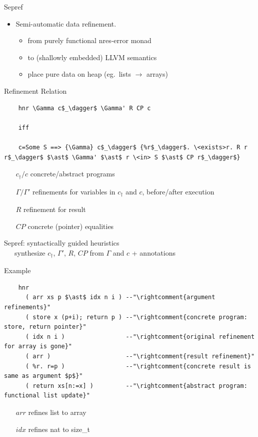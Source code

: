 \documentclass[fleqn]{beamer}
\begin{document}
\begin{frame}[fragile]{Sepref}
  \begin{itemize}
   \item Semi-automatic data refinement.
    \begin{itemize}
     \item from purely functional nres-error monad
     \item to (shallowly embedded) LLVM semantics
     \item place pure data on heap (eg.\ lists $\to$ arrays)

    \end{itemize}
  \end{itemize}
\end{frame}
\begin{frame}[fragile]{Refinement Relation}

  \begin{lstlisting}
    hnr \Gamma c$_\dagger$ \Gamma' R CP c

    iff

    c=Some S ==> {\Gamma} c$_\dagger$ {%r$_\dagger$. \<exists>r. R r r$_\dagger$ $\ast$ \Gamma' $\ast$ r \<in> S $\ast$ CP r$_\dagger$}
  \end{lstlisting}

  \begin{itemize}
   \item[{$c_\dagger / c$}] concrete/abstract programs
   \item[{$\Gamma / \Gamma'$}] refinements for variables in $c_\dagger$ and $c$, before/after execution
   \item[{$R$}] refinement for result
   \item[{$CP$}] concrete (pointer) equalities

  \end{itemize}
  \vfill

  Sepref: syntactically guided heuristics\\
    ~~~synthesize $c_\dagger$, $\Gamma'$, $R$, $CP$ from $\Gamma$ and $c$ + annotations


\end{frame}
\begin{frame}[fragile]{Example}
  \begin{lstlisting}
    hnr
      ( arr xs p $\ast$ idx n i ) --"\rightcomment{argument refinements}"
      ( store x (p+i); return p ) --"\rightcomment{concrete program: store, return pointer}"
      ( idx n i )                 --"\rightcomment{original refinement for array is gone}"
      ( arr )                     --"\rightcomment{result refinement}"
      ( %r. r=p )                 --"\rightcomment{concrete result is same as argument $p$}"
      ( return xs[n:=x] )         --"\rightcomment{abstract program: functional list update}"
  \end{lstlisting}

  \begin{itemize}
   \item[$arr$] refines list to array
   \item[$idx$] refines nat to size\_t


  \end{itemize}
\end{frame}
\end{document}
